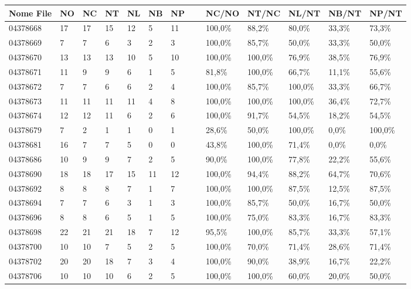 	\begin{table}

		
	\begin{center}
	\begin{tabular}{|l|l|l|l|l|l|l|l|l|l|l|l|l|} \hline
Nome File & NO & NC & NT & NL & NB & NP & ~ & NC/NO & NT/NC & NL/NT & NB/NT & NP/NT \\ \hline
04378668 & 17 & 17 & 15 & 12 & 5 & 11 & ~ & 100,0\% & 88,2\% & 80,0\% & 33,3\% & 73,3\% \\
04378669 & 7 & 7 & 6 & 3 & 2 & 3 & ~ & 100,0\% & 85,7\% & 50,0\% & 33,3\% & 50,0\%\\
04378670 & 13 & 13 & 13 & 10 & 5 & 10 & ~ & 100,0\% & 100,0\% & 76,9\% & 38,5\% & 76,9\%\\
04378671 & 11 & 9 & 9 & 6 & 1 & 5 & ~ & 81,8\% & 100,0\% & 66,7\% & 11,1\% & 55,6\%\\
04378672 & 7 & 7 & 6 & 6 & 2 & 4 & ~ & 100,0\% & 85,7\% & 100,0\% & 33,3\% & 66,7\%\\
04378673 & 11 & 11 & 11 & 11 & 4 & 8 & ~ & 100,0\% & 100,0\% & 100,0\% & 36,4\% & 72,7\%\\
04378674 & 12 & 12 & 11 & 6 & 2 & 6 & ~ & 100,0\% & 91,7\% & 54,5\% & 18,2\% & 54,5\%\\
04378679 & 7 & 2 & 1 & 1 & 0 & 1 & ~ & 28,6\% & 50,0\% & 100,0\% & 0,0\% & 100,0\%\\
04378681 & 16 & 7 & 7 & 5 & 0 & 0 & ~ & 43,8\% & 100,0\% & 71,4\% & 0,0\% & 0,0\%\\
04378686 & 10 & 9 & 9 & 7 & 2 & 5 & ~ & 90,0\% & 100,0\% & 77,8\% & 22,2\% & 55,6\%\\
04378690 & 18 & 18 & 17 & 15 & 11 & 12 & ~ & 100,0\% & 94,4\% & 88,2\% & 64,7\% & 70,6\%\\
04378692 & 8 & 8 & 8 & 7 & 1 & 7 & ~ & 100,0\% & 100,0\% & 87,5\% & 12,5\% & 87,5\%\\
04378694 & 7 & 7 & 6 & 3 & 1 & 3 & ~ & 100,0\% & 85,7\% & 50,0\% & 16,7\% & 50,0\%\\
04378696 & 8 & 8 & 6 & 5 & 1 & 5 & ~ & 100,0\% & 75,0\% & 83,3\% & 16,7\% & 83,3\%\\
04378698 & 22 & 21 & 21 & 18 & 7 & 12 & ~ & 95,5\% & 100,0\% & 85,7\% & 33,3\% & 57,1\%\\
04378700 & 10 & 10 & 7 & 5 & 2 & 5 & ~ & 100,0\% & 70,0\% & 71,4\% & 28,6\% & 71,4\%\\
04378702 & 20 & 20 & 18 & 7 & 3 & 4 & ~ & 100,0\% & 90,0\% & 38,9\% & 16,7\% & 22,2\%\\
04378706 & 10 & 10 & 10 & 6 & 2 & 5 & ~ & 100,0\% & 100,0\% & 60,0\% & 20,0\% & 50,0\%\\

\end{tabular}
\end{center}
\end{table}
